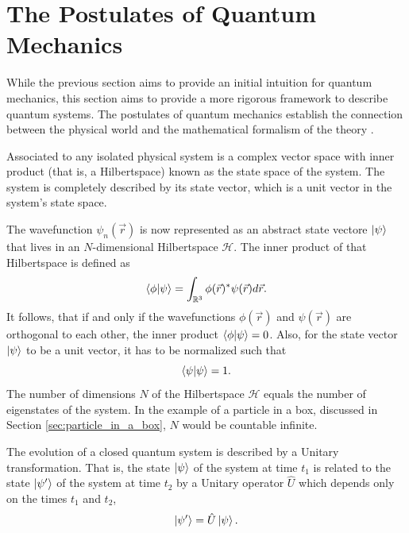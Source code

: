 \section{The Postulates of Quantum Mechanics} \label{sec:postulates}
  While the previous section aims to provide an initial intuition for quantum mechanics, this section aims to provide a more rigorous framework to describe quantum systems. The postulates of quantum mechanics establish the connection between the physical world and the mathematical formalism of the theory \cite{Nielsen2010-xd}.
	\begin{postulatebox}
		\begin{postulate}
			\label{post:qm_1}
			Associated to any isolated physical system is a complex vector space with inner product (that is, a Hilbertspace) known as the state space of the system. The system is completely described by its state vector, which is a unit vector in the system's state space.
		\end{postulate}
	\end{postulatebox}
	The wavefunction $\psi_n(\vec{r})$ is now represented as an abstract state vectore $\ket{\psi}$ that lives in an $N$-dimensional Hilbertspace $\mathcal{H}$.
	The inner product of that Hilbertspace \cite{Jackson2013-lm} is defined as
	\begin{equation}
		\label{eq:hilbertspace_inner_product_definition}
		\braket{\phi}{\psi}=\int_{\mathbb{R}^3}\phi(\vec{r})^*\psi(\vec{r})d\vec{r}.
	\end{equation}
	It follows, that if and only if the wavefunctions $\phi(\vec{r})$ and $\psi(\vec{r})$ are orthogonal to each other, the inner product $\braket{\phi}{\psi}=0$. Also, for the state vector $\ket{\psi}$ to be a unit vector, it has to be normalized such that
	\begin{equation}
		\label{eq:psi_normalize}
		\braket{\psi}{\psi}=1.
	\end{equation}
	The number of dimensions $N$ of the Hilbertspace $\mathcal{H}$ equals the number of eigenstates of the system. In the example of a particle in a box, discussed in Section \ref{sec:particle_in_a_box}, $N$ would be countable infinite.
	\begin{postulatebox}
		\begin{postulate}
			\label{post:qm_2}
			The evolution of a closed quantum system is described by a Unitary transformation. That is, the state $\ket{\psi}$ of the system at time $t_1$ is related to the state $\ket{\psi'}$ of the system at time $t_2$ by a Unitary operator $\hat{U}$ which depends only on the times $t_1$ and $t_2$,
			\begin{equation}
				\label{eq:time_evolution}
				\ket{\psi'}=\hat{U}\ket{\psi}.
			\end{equation}
		\end{postulate}
	\end{postulatebox}
